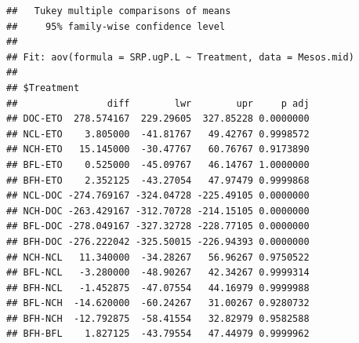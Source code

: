 \documentclass[
]{article}
\newenvironment{Shaded}{\begin{snugshade}}{\end{snugshade}}
\newcommand{\AttributeTok}[1]{\textcolor[rgb]{0.13,0.29,0.53}{#1}}
\newcommand{\CommentTok}[1]{\textcolor[rgb]{0.56,0.35,0.01}{\textit{#1}}}
\newcommand{\DecValTok}[1]{\textcolor[rgb]{0.00,0.00,0.81}{#1}}
\newcommand{\FunctionTok}[1]{\textcolor[rgb]{0.13,0.29,0.53}{\textbf{#1}}}
\newcommand{\NormalTok}[1]{#1}
\newcommand{\OtherTok}[1]{\textcolor[rgb]{0.56,0.35,0.01}{#1}}
\newcommand{\SpecialCharTok}[1]{\textcolor[rgb]{0.81,0.36,0.00}{\textbf{#1}}}
\newcommand{\StringTok}[1]{\textcolor[rgb]{0.31,0.60,0.02}{#1}}
\begin{document}
\begin{verbatim}
##   Tukey multiple comparisons of means
##     95% family-wise confidence level
## 
## Fit: aov(formula = SRP.ugP.L ~ Treatment, data = Mesos.mid)
## 
## $Treatment
##                diff        lwr        upr     p adj
## DOC-ETO  278.574167  229.29605  327.85228 0.0000000
## NCL-ETO    3.805000  -41.81767   49.42767 0.9998572
## NCH-ETO   15.145000  -30.47767   60.76767 0.9173890
## BFL-ETO    0.525000  -45.09767   46.14767 1.0000000
## BFH-ETO    2.352125  -43.27054   47.97479 0.9999868
## NCL-DOC -274.769167 -324.04728 -225.49105 0.0000000
## NCH-DOC -263.429167 -312.70728 -214.15105 0.0000000
## BFL-DOC -278.049167 -327.32728 -228.77105 0.0000000
## BFH-DOC -276.222042 -325.50015 -226.94393 0.0000000
## NCH-NCL   11.340000  -34.28267   56.96267 0.9750522
## BFL-NCL   -3.280000  -48.90267   42.34267 0.9999314
## BFH-NCL   -1.452875  -47.07554   44.16979 0.9999988
## BFL-NCH  -14.620000  -60.24267   31.00267 0.9280732
## BFH-NCH  -12.792875  -58.41554   32.82979 0.9582588
## BFH-BFL    1.827125  -43.79554   47.44979 0.9999962
\end{verbatim}

\begin{Shaded}
\end{Shaded}
\end{document}
